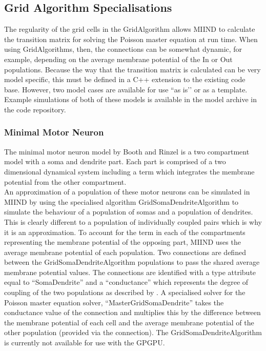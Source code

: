 \documentclass[utf8]{frontiers_suppmat} %
\begin{document}
\subsection{Grid Algorithm Specialisations}
\label{gridalgospec}
The regularity of the grid cells in the GridAlgorithm allows MIIND to calculate the transition matrix for solving the Poisson master equation at run time.  When using GridAlgorithms, then, the connections can be somewhat dynamic, for example, depending on the average membrane potential of the In or Out populations. Because the way that the transition matrix is calculated can be very model specific, this must be defined in a C++ extension to the existing code base. However, two model cases are available for use ``as is’’ or as a template. Example simulations of both of these models is available in the model archive in the code repository.\\

\subsubsection{Minimal Motor Neuron}
The minimal motor neuron model by Booth and Rinzel \cite{booth1995minimal} is a two compartment model with a soma and dendrite part. Each part is comprised of a two dimensional dynamical system including a term which integrates the membrane potential from the other compartment. \\

An approximation of a population of these motor neurons can be simulated in MIIND by using the specialised algorithm GridSomaDendriteAlgorithm to simulate the behaviour of a population of somas and a population of dendrites. This is clearly different to a population of individually coupled pairs which is why it is an approximation. To account for the term in each of the compartments representing the membrane potential of the opposing part, MIIND uses the average membrane potential of each population. Two connections are defined between the GridSomaDendriteAlgorithm populations to pass the shared average membrane potential values. The connections are identified with a type attribute equal to ``SomaDendrite'' and a ``conductance'' which represents the degree of coupling of the two populations as described by \cite{booth1995minimal}. A specialised solver for the Poisson master equation solver, ``MasterGridSomaDendrite'' takes the conductance value of the connection and multiplies this by the difference between the membrane potential of each cell and the average membrane potential of the other population (provided via the connection). The GridSomaDendriteAlgorithm is currently not available for use with the GPGPU.\\
\\
\end{document}
